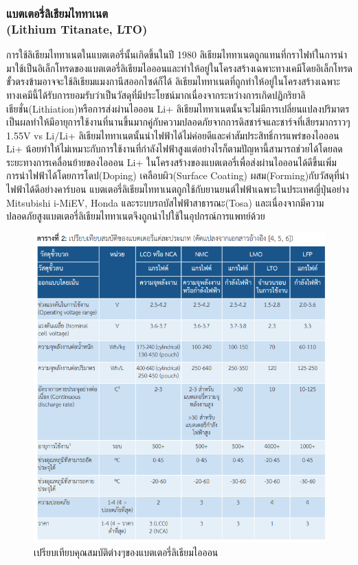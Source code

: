 \subsubsection*{แบตเตอรี่ลิเธียมไททาเนต\\ (Lithium Titanate, LTO)}
	การใช้ลิเธียมไททาเนตในแบตเตอรี่นั้นเกิดขึ้นในปี 1980 ลิเธียมไททาเนตถูกแทนที่กราไฟท์ในการนำมาใช้เป็นอิเล็กโทรดของแบตเตอรี่ลิเธียมไอออนและทำให้อยู่ในโครงสร้างเฉพาะทางเคมีโดยอิเล็กโทรดขั้วตรงข้ามอาจจะใช้ลิเธียมแมงกานีสออกไซด์ก็ได้ ลิเธียมไททาเนตที่ถูกทำให้อยู่ในโครงสร้างเฉพาะทางเคมีนี้ได้รับการยอมรับว่าเป็นวัสดุที่มีประโยชน์มากเนื่องจากระหว่างการเกิดปฏิกริยาลิเธียชั่น(Lithiation)หรือการส่งผ่านไอออน Li+ ลิเธียมไททาเนตนั้นจะไม่มีการเปลี่ยนแปลงปริมาตรเป็นผลทำให้มีอายุการใช้งานที่นานขึ้นมากคู่กับความปลอดภัยจากการดิสชาร์จและชาร์จที่เสียรมากราวๆ 1.55V vs Li/Li+ ลิเธียมไททาเนตนั้นนำไฟฟ้าได้ไม่ค่อยดีและค่าสัมประสิทธิ์การแพร่ของไอออน Li+ น้อยทำให้ไม่เหมาะกับการใช้งานที่กำลังไฟฟ้าสูงแต่อย่างไรก็ตามปัญหานี้สามารถช่วยได้โดยลดระยะทางการเคลื่อนย้ายของไอออน Li+ ในโครงสร้างของแบตเตอรี่เพื่อส่งผ่านไอออนได้ดีขึ้นเพิ่มการนำไฟฟ้าได้โดยการโดป(Doping) เคลือบผิว(Surface Coating) ผสม(Forming)กับวัสดุที่นำไฟฟ้าได้ดีอย่างคาร์บอน
	\newline แบตเตอรี่ลิเธียมไททาเนตถูกใช้กับยานยนต์ไฟฟ้าเฉพาะในประเทศญี่ปุ่นอย่าง Mitsubishi i-MiEV, Honda และระบบรถบัสไฟฟ้าสาธารณะ(Tosa) และเนื่องจากมีความปลอดภัยสูงแบตเตอรี่ลิเธียมไททาเนตจึงถูกนำไปใช้ในอุปกรณ์การแพทย์ด้วย
\begin{center}
	\begin{figure}[!h]
		\includegraphics[width=0.6\linewidth]{Chapters/img/Compare_Spec_Batteries.png}
			\centering
			\captionsetup{justification=centering,margin=2cm}
			\caption{เปรียบเทียบคุณสมบัติต่างๆของแบตเตอรี่ลิเธียมไอออน}
	\end{figure}
\end{center}
